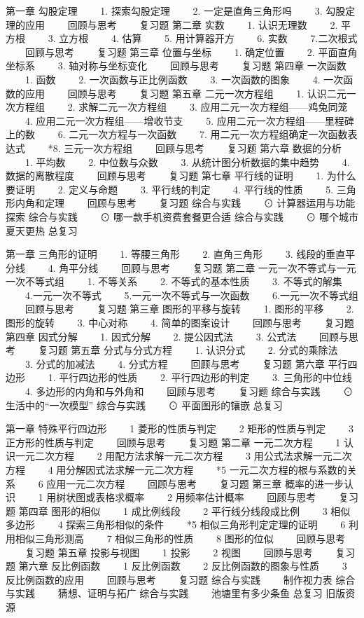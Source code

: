 第一章 勾股定理
　　1. 探索勾股定理
　　2. 一定是直角三角形吗
　　3. 勾股定理的应用
　　回顾与思考
　　复习题
第二章 实数
　　1. 认识无理数
　　2. 平方根
　　3. 立方根
　　4. 估算
　　5. 用计算器开方
　　6. 实数
　　7.二次根式
　　回顾与思考
　　复习题
第三章 位置与坐标
　　1. 确定位置
　　2. 平面直角坐标系
　　3. 轴对称与坐标变化
　　回顾与思考
　　复习题
第四章 一次函数
　　1. 函数
　　2. 一次函数与正比例函数
　　3. 一次函数的图象
　　4. 一次函数的应用
　　回顾与思考
　　复习题
第五章 二元一次方程组
　　1. 认识二元一次方程组
　　2. 求解二元一次方程组
　　3. 应用二元一次方程组——鸡兔同笼
　　4. 应用二元一次方程组——增收节支
　　5. 应用二元一次方程组——里程碑上的数
　　6. 二元一次方程与一次函数
　　7. 用二元一次方程组确定一次函数表达式
　　*8. 三元一次方程组
　　回顾与思考
　　复习题
第六章 数据的分析
　　1. 平均数
　　2. 中位数与众数
　　3. 从统计图分析数据的集中趋势
　　4. 数据的离散程度
　　回顾与思考
　　复习题
第七章 平行线的证明
　　1. 为什么要证明
　　2. 定义与命题
　　3. 平行线的判定
　　4. 平行线的性质
　　5. 三角形内角和定理
　　回顾与思考
　　复习题
综合与实践
　　⊙ 计算器运用与功能探索
综合与实践
　　⊙ 哪一款手机资费套餐更合适
综合与实践
　　⊙ 哪个城市夏天更热
总复习



第一章 三角形的证明
　　1. 等腰三角形
　　2. 直角三角形
　　3. 线段的垂直平分线
　　4. 角平分线
　　回顾与思考
　　复习题
第二章 一元一次不等式与一元一次不等式组
　　1. 不等关系
　　2. 不等式的基本性质
　　3. 不等式的解集
　　4.一元一次不等式
　　5.一元一次不等式与一次函数
　　6.一元一次不等式组
　　回顾与思考
　　复习题
第三章 图形的平移与旋转
　　1. 图形的平移
　　2. 图形的旋转
　　3. 中心对称
　　4. 简单的图案设计
　　回顾与思考
　　复习题
第四章 因式分解
　　1. 因式分解
　　2. 提公因式法
　　3. 公式法
　　回顾与思考
　　复习题
第五章 分式与分式方程
　　1. 认识分式
　　2. 分式的乘除法
　　3. 分式的加减法
　　4. 分式方程
　　回顾与思考
　　复习题
第六章 平行四边形
　　1. 平行四边形的性质
　　2. 平行四边形的判定
　　3. 三角形的中位线
　　4. 多边形的内角和与外角和
　　回顾与思考
　　复习题
综合与实践
　　⊙ 生活中的“一次模型”
综合与实践
　　⊙ 平面图形的镶嵌
总复习


第一章 特殊平行四边形
　　1 菱形的性质与判定
　　2 矩形的性质与判定
　　3 正方形的性质与判定
　　回顾与思考
　　复习题
第二章 一元二次方程
　　1 认识一元二次方程
　　2 用配方法求解一元二次方程
　　3 用公式法求解一元二次方程
　　4 用分解因式法求解一元二次方程
　　*5 一元二次方程的根与系数的关系
　　6 应用一元二次方程
　　回顾与思考
　　复习题
第三章 概率的进一步认识
　　1 用树状图或表格求概率
　　2 用频率估计概率
　　回顾与思考
　　复习题
第四章 图形的相似
　　1 成比例线段
　　2 平行线分线段成比例
　　3 相似多边形
　　4 探索三角形相似的条件
　　*5 相似三角形判定定理的证明
　　6 利用相似三角形测高
　　7 相似三角形的性质
　　8 图形的位似
　　回顾与思考
　　复习题
第五章 投影与视图
　　1 投影
　　2 视图
　　回顾与思考
　　复习题
第六章 反比例函数
　　1 反比例函数
　　2 反比例函数的图象与性质
　　3 反比例函数的应用
　　回顾与思考
　　复习题
综合与实践
　　制作视力表
综合与实践
　　猜想、证明与拓广
综合与实践
　　池塘里有多少条鱼
总复习
旧版资源


